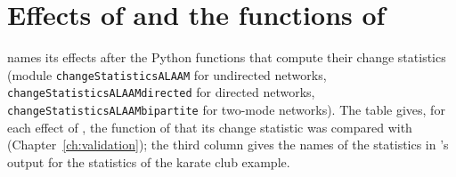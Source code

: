 \chapter{Effects of \texorpdfstring{\nwalaam}{nwalaam} and the functions of \texorpdfstring{\alaamee}{ALAAMEE}}\label{app:translation}

\alaamee{} names its effects after the Python functions that compute their change statistics (module \texttt{changeStatisticsALAAM} for undirected networks, \texttt{changeStatisticsALAAMdirected} for directed networks, \texttt{changeStatisticsALAAMbipartite} for two-mode networks). The table gives, for each effect of \nwalaam{}, the function of \alaamee{} that its change statistic was compared with (Chapter~\ref{ch:validation}); the third column gives the names of the statistics in \mpnet{}'s output for the statistics of the karate club example.

